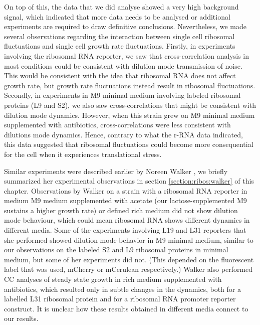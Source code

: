 On top of this, the data that we did analyse showed a very high background signal, which indicated that 
more data needs to be analysed or additional experiments are required
to draw definitive conclusions.
%
Nevertheless, we made several observations regarding the interaction between single cell ribosomal fluctuations and single cell growth rate fluctuations.
%
Firstly, in experiments involving the ribosomal RNA reporter, we saw that cross-correlation analysis in most conditions could be consistent with dilution mode transmission of noise.
This would be consistent with the idea that ribosomal RNA does not affect growth rate, but growth rate fluctuations instead result in ribosomal fluctuations.
%
Secondly, in experiments in M9 minimal medium involving labeled ribosomal proteins (L9 and S2), we also saw cross-correlations that might be consistent with dilution mode dynamics.
However, when this strain grew on M9 minimal medium supplemented with antibiotics, cross-correlations were less consistent with dilutions mode dynamics.
Hence, contrary to what the r-RNA data indicated, this data suggested that ribosomal fluctuations could become more consequential for the cell when it experiences translational stress.

Similar experiments were described earlier by Noreen Walker \cite{Walker2016t}, 
we briefly summarized her experimental observations in section \ref{section:ribos:walker} of this chapter.
%
Observations by Walker on a strain with a ribosomal RNA reporter in medium M9 medium supplemented with acetate (our lactose-supplemented M9 sustains a higher growth rate) or defined rich medium did not show dilution mode behaviour, which could mean ribosomal RNA shows different dynamics in different media.
%
Some of the experiments involving L19 and L31 reporters that she performed showed dilution mode behavior in M9 minimal medium, similar to our observations on the labeled S2 and L9 ribosomal proteins in minimal medium, but some of her experiments did not. (This depended on the fluorescent label that was used, mCherry or mCerulean respectively.)
%
Walker also performed CC analyses of steady state growth in rich medium supplemented with antibiotics, which resulted only in subtle changes in the dynamics, both for a labelled L31 ribosomal protein and for a ribosomal RNA promoter reporter construct.
%
It is unclear how these results obtained in different media connect to our results.

